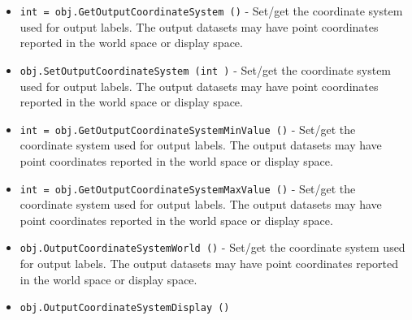 \begin{itemize}
\item  \verb|int = obj.GetOutputCoordinateSystem ()| -  Set/get the coordinate system used for output labels.
 The output datasets may have point coordinates reported in the world space or display space.

\item  \verb|obj.SetOutputCoordinateSystem (int )| -  Set/get the coordinate system used for output labels.
 The output datasets may have point coordinates reported in the world space or display space.

\item  \verb|int = obj.GetOutputCoordinateSystemMinValue ()| -  Set/get the coordinate system used for output labels.
 The output datasets may have point coordinates reported in the world space or display space.

\item  \verb|int = obj.GetOutputCoordinateSystemMaxValue ()| -  Set/get the coordinate system used for output labels.
 The output datasets may have point coordinates reported in the world space or display space.

\item  \verb|obj.OutputCoordinateSystemWorld ()| -  Set/get the coordinate system used for output labels.
 The output datasets may have point coordinates reported in the world space or display space.

\item  \verb|obj.OutputCoordinateSystemDisplay ()|

\end{itemize}
